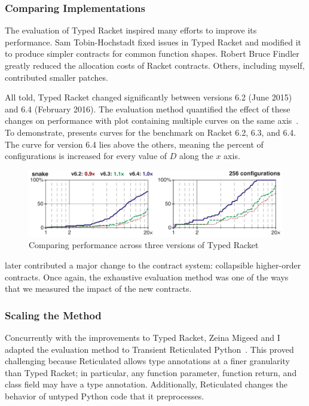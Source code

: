 \subsubsection{Comparing Implementations}

The evaluation of Typed Racket inspired many efforts to improve its performance.
Sam Tobin-Hochstadt fixed issues in Typed Racket and modified it to produce
 simpler contracts for common function shapes.
Robert Bruce Findler greatly reduced the allocation costs of Racket contracts.
Others, including myself, contributed smaller patches.

All told, Typed Racket changed significantly between versions 6.2 (June 2015)
 and 6.4 (February 2016).
The evaluation method quantified the effect of these changes on
 performance with plot containing multiple  curves on the same
 axis~\cite{gtnffvf-jfp-2019}.
To demonstrate,  presents curves for the 
 benchmark on Racket 6.2, 6.3, and 6.4.
The curve for version 6.4 lies above the others, meaning the percent of
  configurations is increased for every value of $D$ along
 the $x$ axis.

\begin{figure}[h]
\includegraphics[width=0.8\columnwidth]{src/snake-jfp.png}
\caption{Comparing performance across three versions of Typed Racket}
\label{fig:snake-jfp}
\end{figure}

\citet{fgsfs-oopsla-2018} later contributed a major change to the contract system:
 collapsible higher-order contracts.
Once again, the exhaustive evaluation method was one of the ways that we
 measured the impact of the new contracts.


\subsubsection{Scaling the Method}

Concurrently with the improvements to Typed Racket, Zeina Migeed and I
 adapted the evaluation method to Transient Reticulated Python~\cite{gm-pepm-2018}.
This proved challenging because Reticulated allows type annotations
 at a finer granularity than Typed Racket; in particular, any function
 parameter, function return, and class field may have a type annotation.
Additionally, Reticulated changes the behavior of untyped Python code that
 it preprocesses.

